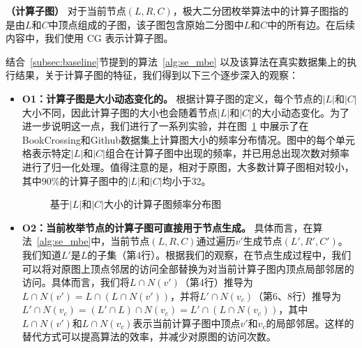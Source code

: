 \begin{definition}

	\textbf{（计算子图）} 对于当前节点$(L,R,C)$，极大二分团枚举算法中的计算子图指的是由$L$和$C$中顶点组成的子图，该子图包含原始二分图中$L$和$C$中的所有边。在后续内容中，我们使用 CG 表示计算子图。

\end{definition}

结合~\ref{subsec:baseline}节提到的算法~\ref{alg:se_mbe} 以及该算法在真实数据集上的执行结果，关于计算子图的特征，我们得到以下三个逐步深入的观察：


\begin{itemize}
\item \textbf{O1：计算子图是大小动态变化的。} 根据计算子图的定义，每个节点的$|L|$和$|C|$大小不同，因此计算子图的大小也会随着节点$|L|$和$|C|$的大小动态变化。为了进一步说明这一点，我们进行了一系列实验，并在图~\ref{fig:distribution} 中展示了在BookCrossing和Github数据集上计算图大小的频率分布情况。图中的每个单元格表示特定$|L|$和$|C|$组合在计算子图中出现的频率，并已用总出现次数对频率进行了归一化处理。值得注意的是，相对于原图，大多数计算子图相对较小，其中90\%的计算子图中的$|L|$和$|C|$均小于32。


\begin{figure} [H] 
	\centering

	\caption{基于$|L|$和$|C|$大小的计算子图频率分布图}
	\label{fig:distribution}

\end{figure}



\item \textbf{O2：当前枚举节点的计算子图可直接用于节点生成。} 具体而言，在算法~\ref{alg:se_mbe}中，当前节点$(L, R, C)$通过遍历$v'$生成节点$(L', R', C')$。我们知道$L'$是$L$的子集（第4行）。根据我们的观察，在节点生成过程中，我们可以将对原图上顶点邻居的访问全部替换为对当前计算子图内顶点局部邻居的访问。具体而言，我们将$L \cap N(v')$（第4行）推导为$L \cap N(v') = L \cap (L \cap N(v'))$，并将$L' \cap N(v_c)$（第6、8行）推导为$L' \cap N(v_c) = (L' \cap L) \cap N(v_c) = L' \cap (L \cap N(v_c))$，其中$L \cap N(v')$和$L \cap N(v_c)$表示当前计算子图中顶点$v'$和$v_c$的局部邻居。这样的替代方式可以提高算法的效率，并减少对原图的访问次数。


\end{itemize}
